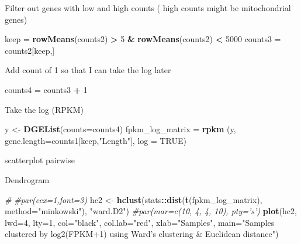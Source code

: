 \documentclass[]{article}
\newenvironment{Shaded}{\begin{snugshade}}{\end{snugshade}}
\newcommand{\KeywordTok}[1]{\textcolor[rgb]{0.13,0.29,0.53}{\textbf{#1}}}
\newcommand{\DataTypeTok}[1]{\textcolor[rgb]{0.13,0.29,0.53}{#1}}
\newcommand{\DecValTok}[1]{\textcolor[rgb]{0.00,0.00,0.81}{#1}}
\newcommand{\StringTok}[1]{\textcolor[rgb]{0.31,0.60,0.02}{#1}}
\newcommand{\CommentTok}[1]{\textcolor[rgb]{0.56,0.35,0.01}{\textit{#1}}}
\newcommand{\OtherTok}[1]{\textcolor[rgb]{0.56,0.35,0.01}{#1}}
\newcommand{\OperatorTok}[1]{\textcolor[rgb]{0.81,0.36,0.00}{\textbf{#1}}}
\newcommand{\NormalTok}[1]{#1}
\begin{document}
Filter out genes with low and high counts ( high counts might be
mitochondrial genes)

\begin{Shaded}
\begin{Highlighting}[]
\NormalTok{keep =}\StringTok{ }\KeywordTok{rowMeans}\NormalTok{(counts2) }\OperatorTok{>}\StringTok{ }\DecValTok{5} \OperatorTok{&}\StringTok{ }\KeywordTok{rowMeans}\NormalTok{(counts2) }\OperatorTok{<}\StringTok{ }\DecValTok{5000} 
\NormalTok{counts3 =}\StringTok{ }\NormalTok{counts2[keep,]}
\end{Highlighting}
\end{Shaded}

Add count of 1 so that I can take the log later

\begin{Shaded}
\begin{Highlighting}[]
\NormalTok{counts4 =}\StringTok{ }\NormalTok{counts3 }\OperatorTok{+}\StringTok{ }\DecValTok{1}
\end{Highlighting}
\end{Shaded}

Take the log (RPKM)

\begin{Shaded}
\begin{Highlighting}[]
\NormalTok{y <-}\StringTok{ }\KeywordTok{DGEList}\NormalTok{(}\DataTypeTok{counts=}\NormalTok{counts4)}
\NormalTok{fpkm_log_matrix =}\StringTok{ }\KeywordTok{rpkm}\NormalTok{ (y, }\DataTypeTok{gene.length=}\NormalTok{counts1[keep,}\StringTok{"Length"}\NormalTok{], }\DataTypeTok{log =} \OtherTok{TRUE}\NormalTok{)}
\end{Highlighting}
\end{Shaded}

scatterplot pairwise

Dendrogram

\begin{Shaded}
\begin{Highlighting}[]
\CommentTok{# }
\CommentTok{#par(cex=1,font=3)}
\NormalTok{hc2 <-}\StringTok{ }\KeywordTok{hclust}\NormalTok{(stats}\OperatorTok{::}\KeywordTok{dist}\NormalTok{(}\KeywordTok{t}\NormalTok{(fpkm_log_matrix), }\DataTypeTok{method=}\StringTok{"minkowski"}\NormalTok{), }\StringTok{"ward.D2"}\NormalTok{)}
\CommentTok{#par(mar=c(10, 4, 4, 10), pty='s')}
\KeywordTok{plot}\NormalTok{(hc2, }\DataTypeTok{lwd=}\DecValTok{4}\NormalTok{, }\DataTypeTok{lty=}\DecValTok{1}\NormalTok{, }\DataTypeTok{col=}\StringTok{"black"}\NormalTok{, }\DataTypeTok{col.lab=}\StringTok{"red"}\NormalTok{, }\DataTypeTok{xlab=}\StringTok{"Samples"}\NormalTok{, }\DataTypeTok{main=}\StringTok{"Samples clustered by log2(FPKM+1) using Ward's clustering & Euclidean distance"}\NormalTok{)}
\end{Highlighting}
\end{Shaded}
\end{document}
